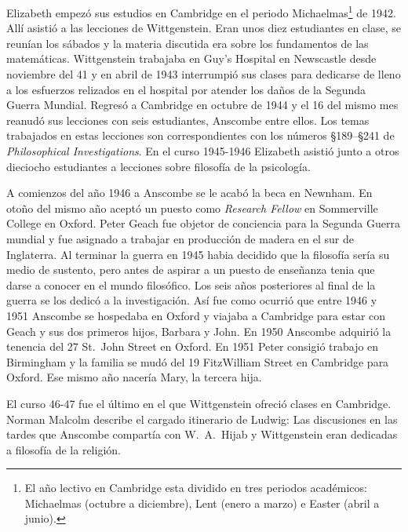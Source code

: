 Elizabeth empezó sus estudios en Cambridge en el periodo Michaelmas\footnote{El año lectivo en Cambridge esta dividido en tres periodos académicos: Michaelmas (octubre a diciembre), Lent (enero a marzo) e Easter (abril a junio).} de 1942. Allí asistió a las lecciones de Wittgenstein. Eran unos diez estudiantes en clase, se reunían los sábados y la materia discutida era sobre los fundamentos de las matemáticas. Wittgenstein trabajaba en Guy's Hospital en Newscastle desde noviembre del 41 y en abril de 1943 interrumpió sus clases para dedicarse de lleno a los esfuerzos relizados en el hospital por atender los daños de la Segunda Guerra Mundial. Regresó a Cambridge en octubre de 1944 y el 16 del mismo mes reanudó sus lecciones con seis estudiantes, Anscombe entre ellos. Los temas trabajados en estas lecciones son correspondientes con los números \S189--\S241 de \emph{Philosophical Investigations}. En el curso 1945-1946 Elizabeth asistió junto a otros dieciocho estudiantes a lecciones sobre filosofía de la psicología.\autocite[Cf.~][354--356]{KlaggeNordman2003pubnpriv}

A comienzos del año 1946 a Anscombe se le acabó la beca en Newnham. En otoño del mismo año aceptó un puesto como \emph{Research Fellow} en Sommerville College en Oxford. Peter Geach fue objetor de conciencia para la Segunda Guerra mundial y fue asignado a trabajar en producción de madera en el sur de Inglaterra.\autocite[Cf.~][34]{teichman2002fellows} Al terminar la guerra en 1945 habia decidido que la filosofía sería su medio de sustento, pero antes de aspirar a un puesto de enseñanza tenia que darse a conocer en el mundo filosófico.\autocite[Cf.~][12]{geach1991philaut} Los seis años posteriores al final de la guerra se los dedicó a la investigación. Así fue como ocurrió que entre 1946 y 1951 Anscombe se hospedaba en Oxford y viajaba a Cambridge para estar con Geach y sus dos primeros hijos, Barbara y John. En 1950 Anscombe adquirió la tenencia del 27 St.~John Street en Oxford. En 1951 Peter consigió trabajo en Birmingham y la familia se mudó del 19 FitzWilliam Street en Cambridge para Oxford.\autocite[Cf.~][208]{NWR} Ese mismo año nacería Mary, la tercera hija.

El curso 46-47 fue el último en el que Wittgenstein ofreció clases en Cambridge. Norman Malcolm describe el cargado itinerario de Ludwig:  Las discusiones en las tardes que Anscombe compartía con W.~A.~Hijab y Wittgenstein eran dedicadas a filosofía de la religión.


